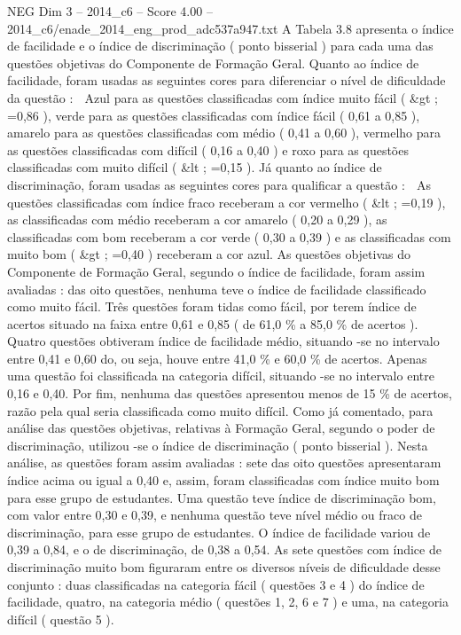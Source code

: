 \begin{textsample}{NEG Dim 3 – 2014\_c6 – Score 4.00 – 2014\_c6/enade\_2014\_eng\_prod\_adc537a947.txt}
A Tabela 3.8 apresenta o índice de facilidade e o índice de discriminação ( ponto bisserial ) para cada uma das questões objetivas do Componente de Formação Geral.
Quanto ao índice de facilidade, foram usadas as seguintes cores para diferenciar o nível de dificuldade da questão :  Azul para as questões classificadas com índice muito fácil ( \&gt ; =0,86 ), verde para as questões classificadas com índice fácil ( 0,61 a 0,85 ), amarelo para as questões classificadas com médio ( 0,41 a 0,60 ), vermelho para as questões classificadas com difícil ( 0,16 a 0,40 ) e roxo para as questões classificadas com muito difícil ( \&lt ; =0,15 ).
Já quanto ao índice de discriminação, foram usadas as seguintes cores para qualificar a questão :  As questões classificadas com índice fraco receberam a cor vermelho ( \&lt ; =0,19 ), as classificadas com médio receberam a cor amarelo ( 0,20 a 0,29 ), as classificadas com bom receberam a cor verde ( 0,30 a 0,39 ) e as classificadas com muito bom ( \&gt ; =0,40 ) receberam a cor azul.
As questões objetivas do Componente de Formação Geral, segundo o índice de facilidade, foram assim avaliadas : das oito questões, nenhuma teve o índice de facilidade classificado como muito fácil.
Três questões foram tidas como fácil, por terem índice de acertos situado na faixa entre 0,61 e 0,85 ( de 61,0 \% a 85,0 \% de acertos ).
Quatro questões obtiveram índice de facilidade médio, situando -se no intervalo entre 0,41 e 0,60 do, ou seja, houve entre 41,0 \% e 60,0 \% de acertos.
Apenas uma questão foi classificada na categoria difícil, situando -se no intervalo entre 0,16 e 0,40.
Por fim, nenhuma das questões apresentou menos de 15 \% de acertos, razão pela qual seria classificada como muito difícil.
Como já comentado, para análise das questões objetivas, relativas à Formação Geral, segundo o poder de discriminação, utilizou -se o índice de discriminação ( ponto bisserial ).
Nesta análise, as questões foram assim avaliadas : sete das oito questões apresentaram índice acima ou igual a 0,40 e, assim, foram classificadas com índice muito bom para esse grupo de estudantes.
Uma questão teve índice de discriminação bom, com valor entre 0,30 e 0,39, e nenhuma questão teve nível médio ou fraco de discriminação, para esse grupo de estudantes.
O índice de facilidade variou de 0,39 a 0,84, e o de discriminação, de 0,38 a 0,54.
As sete questões com índice de discriminação muito bom figuraram entre os diversos níveis de dificuldade desse conjunto : duas classificadas na categoria fácil ( questões 3 e 4 ) do índice de facilidade, quatro, na categoria médio ( questões 1, 2, 6 e 7 ) e uma, na categoria difícil ( questão 5 ).

\end{textsample}
